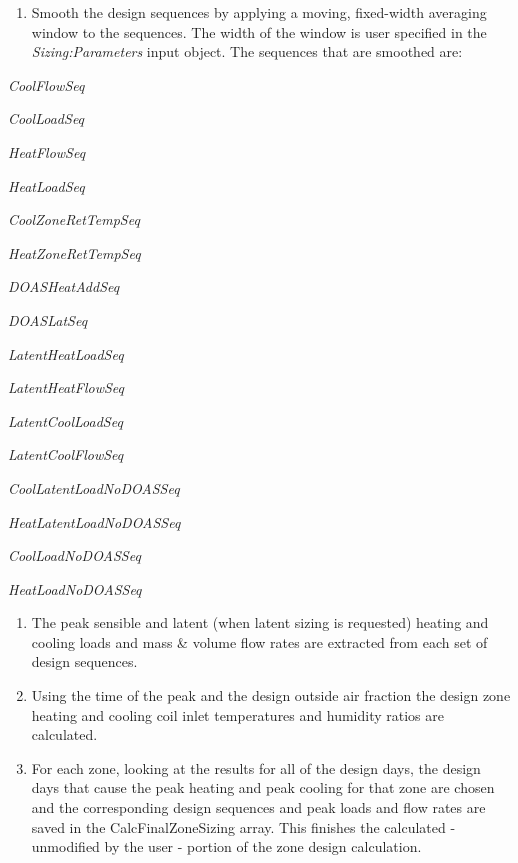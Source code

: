 \begin{enumerate}
\def\labelenumi{(\arabic{enumi})}
\tightlist
\item
  Smooth the design sequences by applying a moving, fixed-width averaging window to the sequences. The width of the window is user specified in the \emph{Sizing:Parameters} input object. The sequences that are smoothed are: 
\end{enumerate}

\begin{enumerate}
\def\labelenumi{(\alph{enumi})}
{\setlength\itemindent{25pt} \item \emph{CoolFlowSeq} }
{\setlength\itemindent{25pt} \item \emph{CoolLoadSeq} }
{\setlength\itemindent{25pt} \item \emph{HeatFlowSeq} }
{\setlength\itemindent{25pt} \item \emph{HeatLoadSeq} }
{\setlength\itemindent{25pt} \item \emph{CoolZoneRetTempSeq} }
{\setlength\itemindent{25pt} \item \emph{HeatZoneRetTempSeq} }
{\setlength\itemindent{25pt} \item \emph{DOASHeatAddSeq} }
{\setlength\itemindent{25pt} \item \emph{DOASLatSeq} }
{\setlength\itemindent{25pt} \item \emph{LatentHeatLoadSeq} }
{\setlength\itemindent{25pt} \item \emph{LatentHeatFlowSeq} }
{\setlength\itemindent{25pt} \item \emph{LatentCoolLoadSeq} }
{\setlength\itemindent{25pt} \item \emph{LatentCoolFlowSeq} }
{\setlength\itemindent{25pt} \item \emph{CoolLatentLoadNoDOASSeq} }
{\setlength\itemindent{25pt} \item \emph{HeatLatentLoadNoDOASSeq} }
{\setlength\itemindent{25pt} \item \emph{CoolLoadNoDOASSeq} }
{\setlength\itemindent{25pt} \item \emph{HeatLoadNoDOASSeq} }
\end{enumerate}

\begin{enumerate}
\def\labelenumi{(\arabic{enumi})}
\setcounter{enumi}{1}
\item
  The peak sensible and latent (when latent sizing is requested) heating and cooling loads and mass \& volume flow rates are extracted from each set of design sequences.
\item
  Using the time of the peak and the design outside air fraction the design zone heating and cooling coil inlet temperatures and humidity ratios are calculated.
\item
  For each zone, looking at the results for all of the design days, the design days that cause the peak heating and peak cooling for that zone are chosen and the corresponding design sequences and peak loads and flow rates are saved in the CalcFinalZoneSizing array. This finishes the calculated - unmodified by the user - portion of the zone design calculation.
\end{enumerate}

